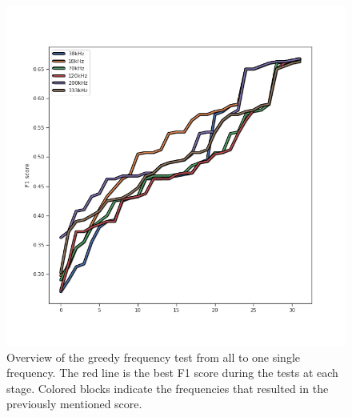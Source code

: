     
        \begin{figure}[H]
        \centering
        \includegraphics[scale=0.7]{figures/perfomance_trend.png}
        \caption{Overview of the greedy frequency test from all to one single frequency. The red line is the best F1 score during the tests at each stage. Colored blocks indicate the frequencies that resulted in the previously mentioned score.}
      	\medskip 
        \label{performance_trend}
    \end{figure}


